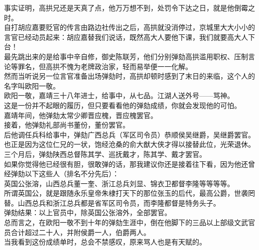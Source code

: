 \begin{multicols}{\theparacolNo}
事实证明，高拱兄还是天真了点，他万万想不到，处罚令下达之日，就是他倒霉之时。\\

自打胡应嘉要贬官的传言由路边社传出之后，高拱就没消停过，京城里大大小小的言官已经动员起来：胡应嘉替我们说话，既然高大人要他下课，我们就要高大人下台！\\

最先跳出来的是给事中辛自修，御史陈联芳，他们分别弹劾高拱滥用职权、压制言论等罪名，但高拱不愧为老牌政治家，轻而易举便一一化解。\\

然而当听说另一位言官准备出场弹劾时，高拱却顿时感到了末日的来临，这个人的名字叫欧阳一敬。\\

欧阳一敬，嘉靖三十八年进士，给事中，从七品。江湖人送外号——骂神。\\

这是一份并不起眼的履历，但只要看看他的弹劾成绩，你就会发现他的可怕。\\

嘉靖年间，他弹劾太常少卿晋应槐，晋应槐罢官。\\

接着，他弹劾礼部尚书董份，董份罢官。\\

后他调任兵科给事中，弹劾广西总兵（军区司令员）恭顺侯吴继爵，吴继爵罢官。也正是因为这位仁兄的一状，饱经沧桑的俞大猷大侠才得以接替此位，光荣退休。\\

三个月后，弹劾陕西总督陈其学、巡抚戴才，陈其学、戴才罢官。\\

如果你觉得他已经很有胆，很敢弹的话，那我建议你还是接着往下看，因为他还曾经弹劾以下这些人（排名不分先后）：\\

英国公张溶，山西总兵董一奎、浙江总兵刘显、锦衣卫都督李隆等等等等。\\

所谓英国公，就是跟随永乐皇帝朱棣打天下的那位张玉的后代，最高公爵，世袭罔替。山西总兵和浙江总兵都是省军区司令员，而李隆都督是特务头子。\\

弹劾结果：以上官员中，除英国公张溶外，全部罢官。\\

总而言之，在欧阳一敬不到十年的弹劾生涯中，倒在他脚下的三品以上部级文武官员合计超过二十人，并附侯爵一人，伯爵两人。\\

当我看到这份成绩单时，总会不禁感叹，原来骂人也是有天赋的。\\


\end{multicols}
